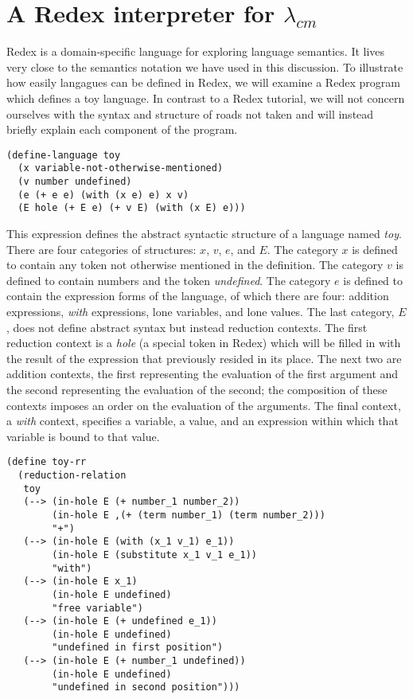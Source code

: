 \documentclass[ms,electronic,twosidetoc,letterpaper,chaptercenter,parttop]{byumsphd}
\begin{document}
\section{A Redex interpreter for $\lambda_{cm}$}

Redex \cite{findler2010redex} is a domain-specific language for exploring language
semantics. It lives very close to the semantics notation we have used in this discussion.
To illustrate how easily langagues can be defined in Redex, we will examine a Redex
program which defines a toy language. In contrast to a Redex tutorial, we will not concern
ourselves with the syntax and structure of roads not taken and will instead briefly
explain each component of the program.

\begin{verbatim}
(define-language toy
  (x variable-not-otherwise-mentioned)
  (v number undefined) 
  (e (+ e e) (with (x e) e) x v)
  (E hole (+ E e) (+ v E) (with (x E) e)))
\end{verbatim}

This expression defines the abstract syntactic structure of a language named \emph{toy}.
There are four categories of structures: $x$, $v$, $e$, and $E$. The category $x$ is
defined to contain any token not otherwise mentioned in the definition. The category $v$
is defined to contain numbers and the token \emph{undefined}. The category $e$ is defined
to contain the expression forms of the language, of which there are four: addition
expressions, \emph{with} expressions, lone variables, and lone values. The last category,
$E$, does not define abstract syntax but instead reduction contexts. The first reduction
context is a \emph{hole} (a special token in Redex) which will be filled in with the
result of the expression that previously resided in its place. The next two are addition
contexts, the first representing the evaluation of the first argument and the second
representing the evaluation of the second; the composition of these contexts imposes an
order on the evaluation of the arguments. The final context, a \emph{with} context,
specifies a variable, a value, and an expression within which that variable is bound to
that value.

\begin{verbatim}
(define toy-rr
  (reduction-relation
   toy
   (--> (in-hole E (+ number_1 number_2))
        (in-hole E ,(+ (term number_1) (term number_2)))
        "+")
   (--> (in-hole E (with (x_1 v_1) e_1))
        (in-hole E (substitute x_1 v_1 e_1))
        "with")
   (--> (in-hole E x_1)
        (in-hole E undefined)
        "free variable")
   (--> (in-hole E (+ undefined e_1))
        (in-hole E undefined)
        "undefined in first position")
   (--> (in-hole E (+ number_1 undefined))
        (in-hole E undefined)
        "undefined in second position")))
\end{verbatim}
\end{document}
